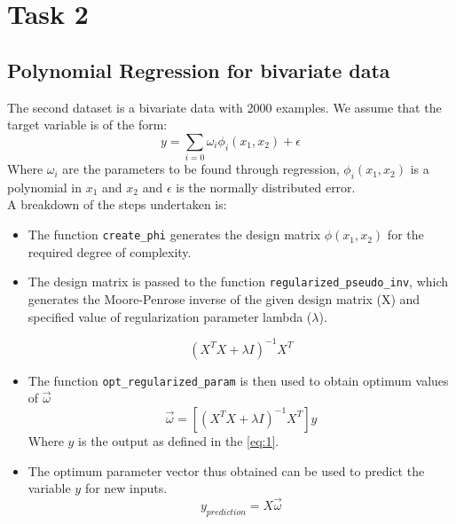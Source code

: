 \documentclass[12pt,a4paper]{article}
\newcommand{\noi}{\noindent}
\def\tt#1{\texttt{#1}}
\begin{document}
\section{Task 2}
\subsection{Polynomial Regression for bivariate data}
The second dataset is a bivariate data with 2000 examples. We assume that the target variable is of the form:
\begin{equation}
\label{eq:1}
    y=\sum_{i=0}\omega _{i}\phi_{i}(x_1,x_2)  +\epsilon 
\end{equation}
Where $\omega_{i}$ are the parameters to be found through regression, $\phi_{i}(x_1,x_2)$ is a polynomial in $x_1$ and $x_2$ and $\epsilon$ is the normally distributed error.\\ 

\noi
A breakdown of the steps undertaken is:
\begin{itemize}
    \itemsep0em
    \item The function \tt{create\_phi} generates the design matrix $\phi(x_1,x_2)$ for the required degree of complexity.
    \item The design matrix is passed to the function \tt{regularized\_pseudo\_inv}, which generates the Moore-Penrose inverse of the given design matrix (X) and specified value of regularization parameter lambda ($\lambda$).
    
    \begin{equation}
         (X^T X + \lambda I)^{-1}X^T
    \end{equation}
    
    \item The function \tt{opt\_regularized\_param} is then used to obtain optimum values of $\vec{\omega}$
    \begin{equation}
        \vec{\omega} = [(X^T X + \lambda I)^{-1}X^T]y
    \end{equation}
    Where $y$ is the output as defined in the \autoref{eq:1}.
    
    \item The optimum parameter vector thus obtained can be used to predict the variable $y$ for new inputs. 
    \begin{equation}
        y_{prediction}=X\vec{\omega}
    \end{equation}
\end{itemize}
\end{document}
